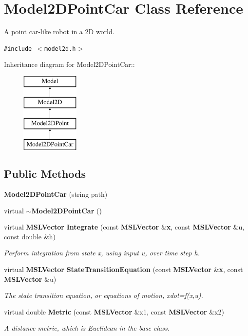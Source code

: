 \section{Model2DPoint\-Car  Class Reference}
\label{classModel2DPointCar}
A point car-like robot in a 2D world. 


{\tt \#include $<$model2d.h$>$}

Inheritance diagram for Model2DPoint\-Car::\begin{figure}[H]
\begin{center}
\leavevmode
\includegraphics[height=4cm]{classModel2DPointCar}
\end{center}
\end{figure}
\subsection*{Public Methods}
\begin{CompactItemize}
\item 
{\bf Model2DPoint\-Car} (string path)
\item 
virtual {\bf $\sim$Model2DPoint\-Car} ()
\item 
virtual {\bf MSLVector} {\bf Integrate} (const {\bf MSLVector} \&{\bf x}, const {\bf MSLVector} \&u, const double \&h)
\begin{CompactList}\small\item\em Perform integration from state x, using input u, over time step h.\item\end{CompactList}\item 
virtual {\bf MSLVector} {\bf State\-Transition\-Equation} (const {\bf MSLVector} \&{\bf x}, const {\bf MSLVector} \&u)
\begin{CompactList}\small\item\em The state transition equation, or equations of motion, xdot=f(x,u).\item\end{CompactList}\item 
virtual double {\bf Metric} (const {\bf MSLVector} \&x1, const {\bf MSLVector} \&x2)
\begin{CompactList}\small\item\em A distance metric, which is Euclidean in the base class.\item\end{CompactList}\end{CompactItemize}
